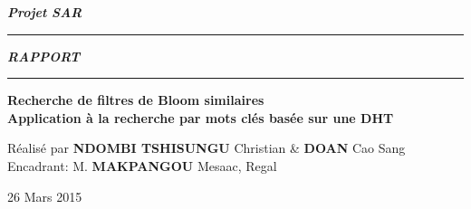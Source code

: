\documentclass[a4paper,11pt]{report}
\begin{document}
	\begin{titlepage}
		\begin{center}
			\large\bfseries\itshape Projet SAR\\
		\end{center}
		\noindent\rule{\linewidth}{3pt}

		\begin{center}
			\Huge\bfseries\itshape RAPPORT\\
		\end{center}
		
		\noindent\rule{\linewidth}{3pt}
		\begin{center}
			\bfseries
			\large Recherche de filtres de Bloom similaires \\
			\large Application à la recherche par mots clés basée sur une DHT
		\end{center}
		\begin{center}
			Réalisé par \textbf{NDOMBI TSHISUNGU} Christian \& \textbf{DOAN} Cao Sang \\
			Encadrant: M. \textbf{MAKPANGOU} Mesaac, Regal
		\end{center}
		\begin{center}
			26 Mars 2015
		\end{center}
	\end{titlepage}

\tableofcontents






\end{document}
